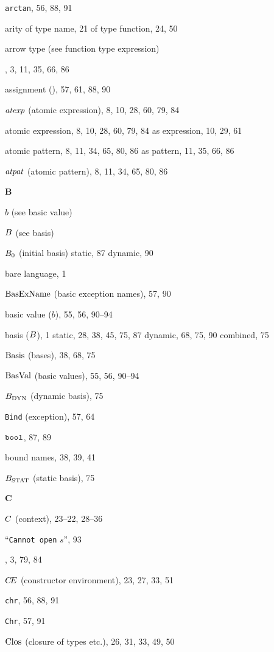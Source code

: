 \begin{theindex}
\item {\tt arctan}, 56, 88, 91
\item arity 
\subitem of type name, 21
\subitem of type function, 24, 50
\item arrow type (see function type expression) 
\item \AS, 3, 11, 35, 66, 86
\item assignment (\ml{:=}), 57, 61, 88, 90
\item ${\it atexp}$ (atomic expression), 8, 10, 28, 60, 79, 84
\item atomic expression, 8, 10, 28, 60, 79, 84
\subitem as expression, 10, 29, 61
\item atomic pattern, 8, 11, 34, 65, 80, 86
\subitem as pattern, 11, 35, 66, 86
\item ${\it atpat}$ (atomic pattern), 8, 11, 34, 65, 80, 86
\indexspace
\parbox{65mm}{\hfil{\large\bf B}\hfil}
\indexspace
\item $b$ (see basic value) 
\item $B$ (see basis) 
\item $B_0$ (initial basis) 
\subitem static, 87
\subitem dynamic, 90
\item bare language, 1
\item ${\rm BasExName}$ (basic exception names), 57, 90
\item basic value ($b$), 55, 56, 90--94
\item basis ($B$), 1
\subitem static, 28, 38, 45, 75, 87
\subitem dynamic, 68, 75, 90
\subitem combined, 75
\item ${\rm Basis}$ (bases), 38, 68, 75
\item ${\rm BasVal}$ (basic values), 55, 56, 90--94
\item $B_{\rm DYN}$ (dynamic basis), 75
\item {\tt Bind} (exception), 57, 64
\item $\mbox{\tt bool}$, 87, 89
\item bound names, 38, 39, 41
\item $B_{\rm STAT}$ (static basis), 75
\indexspace
\parbox{65mm}{\hfil{\large\bf C}\hfil}
\indexspace
\item $C$ (context), 23--22, 28--36
\item ``{\tt Cannot open} $s$'', 93
\item \CASE, 3, 79, 84
\item $\mbox{$C\!E$}$ (constructor environment), 23, 27, 33, 51
\item {\tt chr}, 56, 88, 91
\item {\tt Chr}, 57, 91
\item ${\rm Clos}_{}$ (closure of types etc.), 26, 31, 33, 49, 50

\end{theindex}
